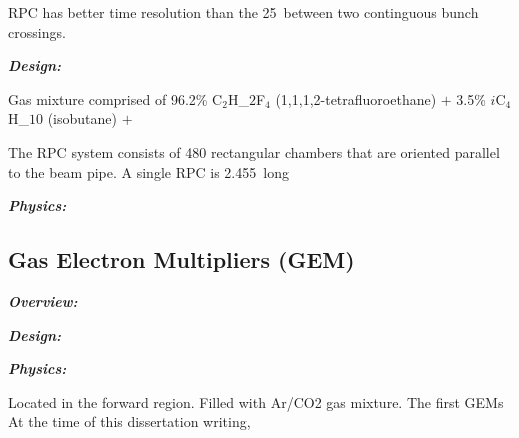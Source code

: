 RPC has better time resolution than the 25~\ns between two continguous \pp bunch crossings.

\textbf{\textit{Design:}}

Gas mixture comprised of 96.2\% C$_{2}$H_${2}$F$_{4}$ (1,1,1,2-tetrafluoroethane) $+$ 3.5\% $i$C$_{4}$H_$10$ (isobutane) $+$ 

The RPC system consists of 480 rectangular chambers that are oriented parallel to the beam pipe.
A single RPC is 2.455~\mm long 


\textbf{\textit{Physics:}}

\subsection{Gas Electron Multipliers (GEM)}
\label{subsec:gem}

\textbf{\textit{Overview:}}

\textbf{\textit{Design:}}

\textbf{\textit{Physics:}}

Located in the forward region.
Filled with Ar/CO2 gas mixture.
The first GEMs At the time of this dissertation writing, 








